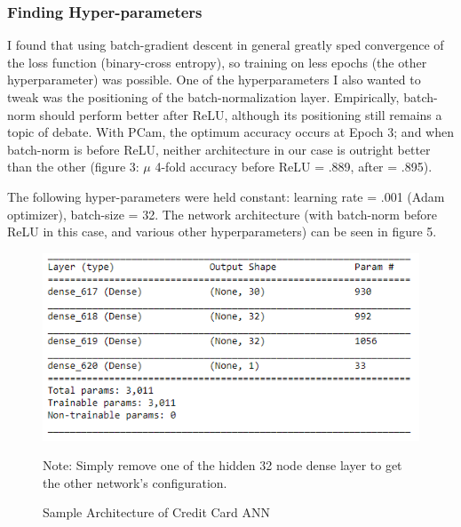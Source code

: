 \documentclass[a4paper]{article}
\begin{document}
\subsubsection{Finding Hyper-parameters}
I found that using batch-gradient descent in general greatly sped convergence of the loss function (binary-cross entropy), so training on less epochs (the other hyperparameter) was possible. One of the hyperparameters I also wanted to tweak was the positioning of the batch-normalization layer. Empirically, batch-norm should perform better after ReLU\autocite{Chollet-Comment}, although its positioning still remains a topic of debate. With PCam, the optimum accuracy occurs at Epoch 3; and when batch-norm is before ReLU, neither architecture in our case is outright better than the other (figure 3: $\mu$ 4-fold accuracy before ReLU = .889, after = .895). 

The following hyper-parameters were held constant: learning rate = .001 (Adam optimizer), batch-size = 32. The network architecture (with batch-norm before ReLU in this case, and various other hyperparameters) can be seen in figure 5.  

\begin{figure}
  \centering
  \includegraphics[width=.7\textwidth]{images/archshitty.PNG}
  \caption{Sample Architecture of Credit Card ANN}
  {Note: Simply remove one of the hidden 32 node dense layer to get the other network's configuration.}
\end{figure}
\end{document}
